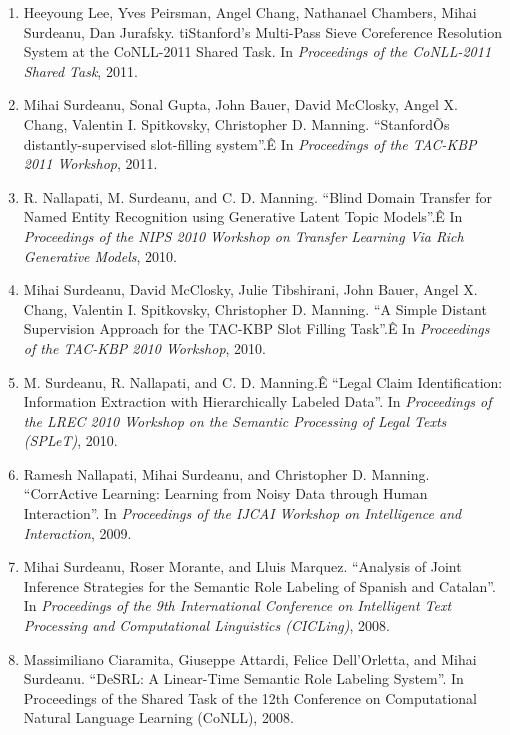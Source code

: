 \documentclass[10pt]{article}
\newcommand{\ve}[1]{{\em #1}} %
\newcommand{\ti}[1]{``#1''} %
\begin{document}
\begin{description}
\begin{enumerate}
\item
Heeyoung Lee, Yves Peirsman, Angel Chang, Nathanael Chambers, Mihai Surdeanu, Dan Jurafsky. ti{Stanford's Multi-Pass Sieve Coreference Resolution System at the CoNLL-2011 Shared Task}.  In \ve{Proceedings of the CoNLL-2011 Shared Task}, 2011.

\item
Mihai Surdeanu, Sonal Gupta, John Bauer, David McClosky, Angel X. Chang, Valentin I. Spitkovsky, Christopher D. Manning.  \ti{StanfordÕs distantly-supervised slot-filling system}.Ê In \ve{Proceedings of the TAC-KBP 2011 Workshop}, 2011.

\item
R. Nallapati, M. Surdeanu, and C. D. Manning.  \ti{Blind Domain Transfer for Named Entity Recognition using Generative Latent Topic Models}.Ê In \ve{Proceedings of the NIPS 2010 Workshop on Transfer Learning Via Rich Generative Models}, 2010.

\item
Mihai Surdeanu, David McClosky, Julie Tibshirani, John Bauer, Angel X. Chang, Valentin I. Spitkovsky, Christopher D. Manning.  \ti{A Simple Distant Supervision Approach for the TAC-KBP Slot Filling Task}.Ê In \ve{Proceedings of the TAC-KBP 2010 Workshop}, 2010.

\item
M. Surdeanu, R. Nallapati, and C. D. Manning.Ê  \ti{Legal Claim Identification: Information Extraction with Hierarchically Labeled Data}.  In \ve{Proceedings of the LREC 2010 Workshop on the Semantic Processing of Legal Texts (SPLeT)}, 2010.

\item
Ramesh Nallapati, Mihai Surdeanu, and Christopher D. Manning.  \ti{CorrActive Learning: Learning from Noisy Data through Human Interaction}.  In \ve{Proceedings of the IJCAI Workshop on Intelligence and Interaction}, 2009.

\item
Mihai Surdeanu, Roser Morante, and Lluis Marquez.  \ti{Analysis of Joint Inference Strategies for the Semantic Role Labeling of Spanish and Catalan}.  In \ve{Proceedings of the 9th International Conference on Intelligent Text Processing and Computational Linguistics (CICLing)}, 2008.

\item
Massimiliano Ciaramita, Giuseppe Attardi, Felice Dell'Orletta, and Mihai Surdeanu.  \ti{DeSRL: A Linear-Time Semantic Role Labeling System}. In {Proceedings of the Shared Task of the 12th Conference on Computational Natural Language Learning (CoNLL)}, 2008.


\end{enumerate}
\end{description}
\end{document}
